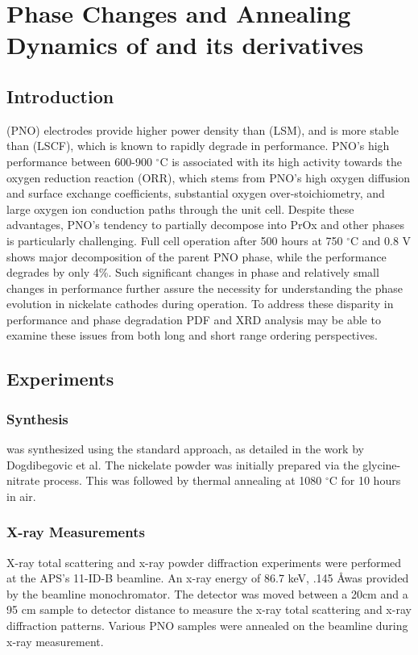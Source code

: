 \graphicspath{{./pno/figures/}}
\chapter{Phase Changes and Annealing Dynamics of  and its derivatives} \label{ch:pno}
\section{Introduction}
 (PNO) electrodes provide higher power density than  (LSM), and is more stable than  (LSCF), which is known to rapidly degrade in performance. \cite{Zhou2012}
PNO's high performance between 600-900 $^\circ$C is associated with its high activity towards the oxygen reduction reaction (ORR), which stems from PNO's high oxygen diffusion and surface exchange coefficients, substantial oxygen over-stoichiometry, and large oxygen ion conduction paths through the unit cell. \cite{Yashima2008}
Despite these advantages, PNO's tendency to partially decompose into PrOx and other phases is particularly challenging. \cite{Dogdibegovic2016}
Full cell operation after 500 hours at 750 $^\circ$C and 0.8 V shows major decomposition of the parent PNO phase, while the performance degrades by only 4\%.
Such significant changes in phase and relatively small changes in performance further assure the necessity for understanding the phase evolution in nickelate cathodes during operation.
To address these disparity in performance and phase degradation PDF and XRD analysis may be able to examine these issues from both long and short range ordering perspectives.

\section{Experiments}
\subsection{ Synthesis}
 was synthesized using the standard approach, as detailed in the work by Dogdibegovic et al. \cite{Dogdibegovic2016}
The nickelate powder was initially prepared via the glycine-nitrate process.
This was followed by thermal annealing at 1080 $^\circ$C for 10 hours in air.

\subsection{X-ray Measurements}
X-ray total scattering and x-ray powder diffraction experiments were performed at the APS's 11-ID-B beamline.
An x-ray energy of 86.7 keV, .145 \AA was provided by the beamline monochromator.
The detector was moved between a 20cm and a 95 cm sample to detector distance to measure the x-ray total scattering and x-ray diffraction patterns.
Various PNO samples were annealed on the beamline during x-ray measurement.
